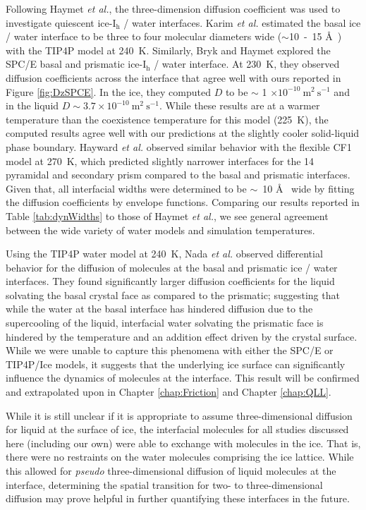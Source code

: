 Following Haymet \textit{et al.}, the three-dimension diffusion
coefficient was used to investigate quiescent ice-I$_\mathrm{h}$ /
water
interfaces. \cite{Karim1987,Karim1988,Hayward2001,Bryk2002,Hayward2002}
Karim \textit{et al.} estimated the basal ice / water interface to be
three to four molecular diameters wide ($\sim$10~-~15 \AA~) with the
TIP4P model at 240~K.\cite{Karim1987,Karim1988} Similarly, Bryk and
Haymet explored the SPC/E basal and prismatic ice-I$_\mathrm{h}$ /
water interface.\cite{Bryk2002} At 230~K, they observed diffusion
coefficients across the interface that agree well with ours reported
in Figure \ref{fig:DzSPCE}. In the ice, they computed $D$ to be $\sim$
1 $\times 10^{-10}~\mathrm{m}^{2}~\mathrm{s}^{-1}$ and in the liquid
$D \sim 3.7 \times 10^{-10}~\mathrm{m}^{2}~\mathrm{s}^{-1}$. While
these results are at a warmer temperature than the coexistence
temperature for this model (225~K), the computed results agree well
with our predictions at the slightly cooler solid-liquid phase
boundary. Hayward \textit{et al.} observed similar behavior with the
flexible CF1 model at 270~K, which predicted slightly narrower
interfaces for the 14\degree~ pyramidal and secondary prism compared
to the basal and prismatic interfaces.\cite{Hayward2001,Hayward2002}
Given that, all interfacial widths were determined to be $\sim$~10
\AA~ wide by fitting the diffusion coefficients by envelope
functions. Comparing our results reported in Table \ref{tab:dynWidths}
to those of Haymet \textit{et al.}, we see general agreement between
the wide variety of water models and simulation temperatures.

Using the TIP4P water model at 240~K, Nada \textit{et al.}  observed
differential behavior for the diffusion of molecules at the basal and
prismatic ice / water interfaces.\cite{Nada1995} They found
significantly larger diffusion coefficients for the liquid solvating
the basal crystal face as compared to the prismatic; suggesting that
while the water at the basal interface has hindered diffusion due to
the supercooling of the liquid, interfacial water solvating the
prismatic face is hindered by the temperature and an addition effect
driven by the crystal surface. While we were unable to capture this
phenomena with either the SPC/E or TIP4P/Ice models, it suggests that
the underlying ice surface can significantly influence the dynamics of
molecules at the interface. This result will be confirmed and
extrapolated upon in Chapter \ref{chap:Friction} and Chapter
\ref{chap:QLL}.

While it is still unclear if it is appropriate to assume
three-dimensional diffusion for liquid at the surface of ice, the
interfacial molecules for all studies discussed here (including our
own) were able to exchange with molecules in the ice. That is, there
were no restraints on the water molecules comprising the ice
lattice. While this allowed for \textit{pseudo} three-dimensional
diffusion of liquid molecules at the interface, determining the
spatial transition for two- to three-dimensional diffusion may prove
helpful in further quantifying these interfaces in the future.

